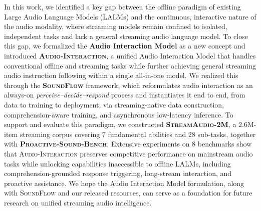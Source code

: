 \documentclass{article}
\begin{document}
In this work, we identified a key gap between the offline paradigm of existing Large Audio Language Models (LALMs) and the continuous, interactive nature of the audio modality, where streaming models remain confined to isolated, independent tasks and lack a general streaming audio language model. To close this gap, we formalized the \textbf{Audio Interaction Model} as a new concept and introduced \textbf{\textsc{Audio-Interaction}}, a unified Audio Interaction Model that handles conventional offline and streaming tasks while further achieving general streaming audio instruction following within a single all-in-one model. We realized this through the \textbf{\textsc{SoundFlow}} framework, which reformulates audio interaction as an always-on \textit{perceive--decide--respond} process and instantiates it end to end, from data to training to deployment, via streaming-native data construction, comprehension-aware training, and asynchronous low-latency inference. To support and evaluate this paradigm, we constructed \textbf{\textsc{StreamAudio-2M}}, a 2.6M-item streaming corpus covering 7 fundamental abilities and 28 sub-tasks, together with \textbf{\textsc{Proactive-Sound-Bench}}. Extensive experiments on 8 benchmarks show that \textsc{Audio-Interaction} preserves competitive performance on mainstream audio tasks while unlocking capabilities inaccessible to offline LALMs, including comprehension-grounded response triggering, long-stream interaction, and proactive assistance. We hope the Audio Interaction Model formulation, along with \textsc{SoundFlow} and our released resources, can serve as a foundation for future research on unified streaming audio intelligence.

\end{document}
